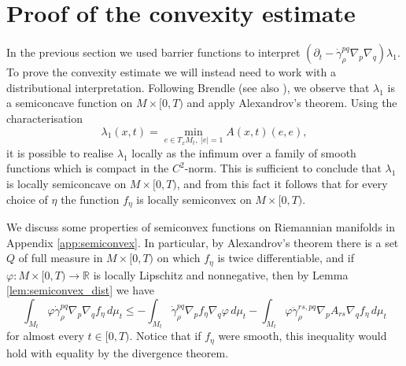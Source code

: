 \documentclass[12pt]{amsart}
\begin{document}
\section{Proof of the convexity estimate}
\label{sec:conv_est}

In the previous section we used barrier functions to interpret $(\partial_t - \dot \gamma_\rho^{pq}\nabla_p \nabla_q) \lambda_1$. To prove the convexity estimate we will instead need to work with a distributional interpretation. Following Brendle \cite{Brendle15} (see also \cite{Lang17}), we observe that $\lambda_1$ is a semiconcave function on $M\times [0,T)$ and apply Alexandrov's theorem. Using the characterisation 
\[\lambda_1(x,t) = \min_{e \in T_x M_t, \; |e| =1} A(x,t) (e,e),\]
it is possible to realise $\lambda_1$ locally as the infimum over a family of smooth functions which is compact in the $C^2$-norm. This is sufficient to conclude that $\lambda_1$ is locally semiconcave on $M\times [0,T)$, and from this fact it follows that for every choice of $\eta$ the function $f_\eta$ is locally semiconvex on $M\times[0,T)$. 

We discuss some properties of semiconvex functions on Riemannian manifolds in Appendix \ref{app:semiconvex}. In particular, by Alexandrov's theorem there is a set $Q$ of full measure in $M\times[0,T)$ on which $f_\eta$ is twice differentiable, and if $\varphi:M\times[0,T) \to \mathbb{R}$ is locally Lipschitz and nonnegative, then by Lemma \ref{lem:semiconvex_dist} we have
\begin{equation}
\label{eq:f_eta_IBP}
\int_{M_t} \varphi \dot \gamma^{pq}_\rho \nabla_p \nabla_q f_\eta \,d\mu_t \leq -\int_{M_t} \dot \gamma^{pq}_\rho \nabla_p f_\eta \nabla_q \varphi\,d\mu_t - \int_{M_t} \varphi \ddot \gamma_\rho^{rs,pq}\nabla_p A_{rs} \nabla_q f_\eta\, d\mu_t
\end{equation}
for almost every $t \in [0,T)$. Notice that if $f_\eta$ were smooth, this inequality would hold with equality by the divergence theorem. 
\end{document}
